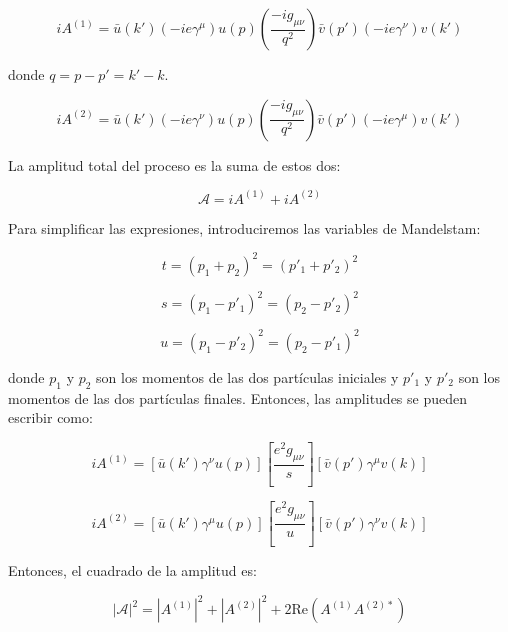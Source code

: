 \begin{equation}
iA^{(1)} = \bar{u}(k')(-ie\gamma^\mu)u(p) \left( \frac{-ig_{\mu\nu}}{q^2} \right) \bar{v}(p')(-ie\gamma^\nu)v(k')
\end{equation}

donde $ q = p - p' = k' - k $.

\begin{equation}
iA^{(2)} = \bar{u}(k')(-ie\gamma^\nu)u(p) \left( \frac{-ig_{\mu\nu}}{q^2} \right) \bar{v}(p')(-ie\gamma^\mu)v(k')
\end{equation}

La amplitud total del proceso es la suma de estos dos:

\begin{equation}
\mathcal{A} = iA^{(1)} + iA^{(2)} 
\end{equation}

Para simplificar las expresiones, introduciremos las variables de Mandelstam:

\begin{equation}
t = (p_1 + p_2)^2 = (p'_1 + p'_2)^2
\end{equation}

\begin{equation}
s = (p_1 - p'_1)^2 = (p_2 - p'_2)^2
\end{equation}

\begin{equation}
u = (p_1 - p'_2)^2 = (p_2 - p'_1)^2
\end{equation}

donde $ p_1 $ y $ p_2 $ son los momentos de las dos partículas iniciales y $ p'_1 $ y $ p'_2 $ son los momentos de las dos partículas finales. Entonces, las amplitudes se pueden escribir como:

\begin{equation}
iA^{(1)} = \left[ \bar{u}(k')\gamma^\nu u(p) \right] \left[ \frac{e^2 g_{\mu\nu}}{s} \right] \left[ \bar{v}(p')\gamma^\mu v(k) \right]
\end{equation}

\begin{equation}
iA^{(2)} = \left[ \bar{u}(k')\gamma^\mu u(p) \right] \left[ \frac{e^2 g_{\mu\nu}}{u} \right] \left[ \bar{v}(p')\gamma^\nu v(k) \right]
\end{equation}

Entonces, el cuadrado de la amplitud es:

\begin{equation}
|\mathcal{A}|^2 = |A^{(1)}|^2 + |A^{(2)}|^2 + 2 \text{Re} \left( A^{(1)} A^{(2)*} \right)
\end{equation}

